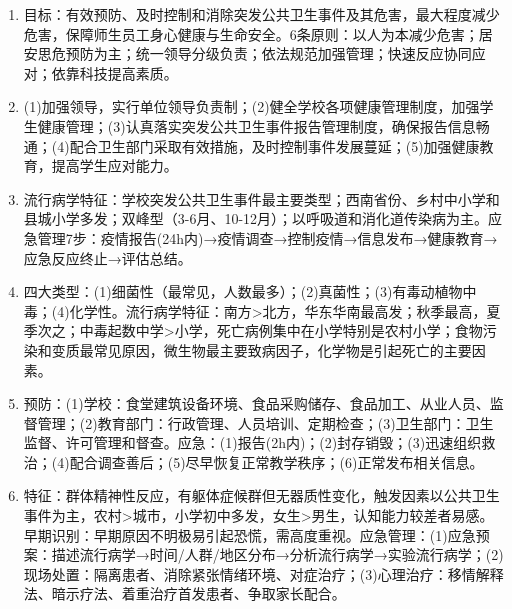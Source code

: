 {\begin{enumerate}[leftmargin=*, itemsep=5pt]
    \item 目标：有效预防、及时控制和消除突发公共卫生事件及其危害，最大程度减少危害，保障师生员工身心健康与生命安全。6条原则：以人为本减少危害；居安思危预防为主；统一领导分级负责；依法规范加强管理；快速反应协同应对；依靠科技提高素质。

    \item (1)加强领导，实行单位领导负责制；(2)健全学校各项健康管理制度，加强学生健康管理；(3)认真落实突发公共卫生事件报告管理制度，确保报告信息畅通；(4)配合卫生部门采取有效措施，及时控制事件发展蔓延；(5)加强健康教育，提高学生应对能力。

    \item 流行病学特征：学校突发公共卫生事件最主要类型；西南省份、乡村中小学和县城小学多发；双峰型（3-6月、10-12月）；以呼吸道和消化道传染病为主。应急管理7步：疫情报告(24h内)→疫情调查→控制疫情→信息发布→健康教育→应急反应终止→评估总结。

    \item 四大类型：(1)细菌性（最常见，人数最多）；(2)真菌性；(3)有毒动植物中毒；(4)化学性。流行病学特征：南方>北方，华东华南最高发；秋季最高，夏季次之；中毒起数中学>小学，死亡病例集中在小学特别是农村小学；食物污染和变质最常见原因，微生物最主要致病因子，化学物是引起死亡的主要因素。

    \item 预防：(1)学校：食堂建筑设备环境、食品采购储存、食品加工、从业人员、监督管理；(2)教育部门：行政管理、人员培训、定期检查；(3)卫生部门：卫生监督、许可管理和督查。应急：(1)报告(2h内)；(2)封存销毁；(3)迅速组织救治；(4)配合调查善后；(5)尽早恢复正常教学秩序；(6)正常发布相关信息。

    \item 特征：群体精神性反应，有躯体症候群但无器质性变化，触发因素以公共卫生事件为主，农村>城市，小学初中多发，女生>男生，认知能力较差者易感。早期识别：早期原因不明极易引起恐慌，需高度重视。应急管理：(1)应急预案：描述流行病学→时间/人群/地区分布→分析流行病学→实验流行病学；(2)现场处置：隔离患者、消除紧张情绪环境、对症治疗；(3)心理治疗：移情解释法、暗示疗法、着重治疗首发患者、争取家长配合。
\end{enumerate}
}

\newpage
